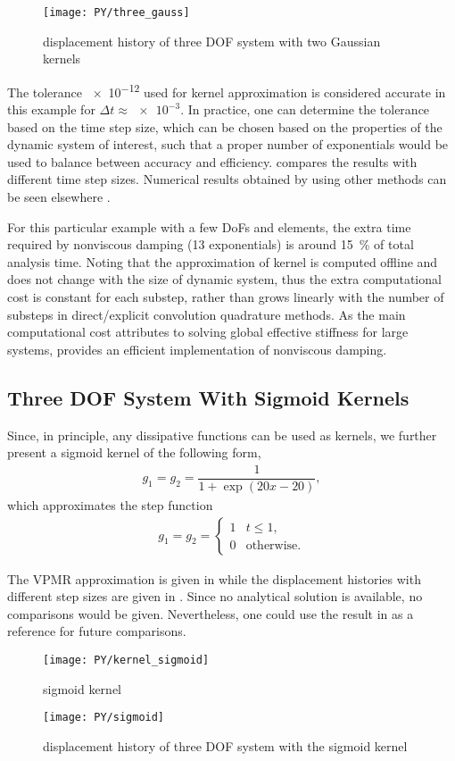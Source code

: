 \begin{figure}[H]
\centering
\texttt{[image: PY/three\_gauss]}
\caption{displacement history of three DOF system with two Gaussian kernels}\label{fig:three_gauss}
\end{figure}
The tolerance \num{e-12} used for kernel approximation is considered accurate in this example for $\Delta{}t\approx\num{e-3}$. In practice, one can determine the tolerance based on the time step size, which can be chosen based on the properties of the dynamic system of interest, such that a proper number of exponentials would be used to balance between accuracy and efficiency.  compares the results with different time step sizes. Numerical results obtained by using other methods can be seen elsewhere \citep{Shen2021}.

For this particular example with a few DoFs and elements, the extra time required by nonviscous damping (\num{13} exponentials) is around \SI{15}{\percent} of total analysis time. Noting that the approximation of kernel is computed offline and does not change with the size of dynamic system, thus the extra computational cost is constant for each substep, rather than grows linearly with the number of substeps in direct/explicit convolution quadrature methods. As the main computational cost attributes to solving global effective stiffness for large systems,  provides an efficient implementation of nonviscous damping.
\subsection{Three DOF System With Sigmoid Kernels}
Since, in principle, any dissipative functions can be used as kernels, we further present a sigmoid kernel of the following form,
\begin{gather}
g_1=g_2=\dfrac{1}{1+\exp\left(20x-20\right)},
\end{gather}
which approximates the step function
\begin{gather}
g_1=g_2=\left\{
\begin{array}{ll}
1&t\leqslant1,\\
0&\text{otherwise.}
\end{array}
\right.
\end{gather}

The VPMR approximation is given in  while the displacement histories with different step sizes are given in . Since no analytical solution is available, no comparisons would be given. Nevertheless, one could use the result in  as a reference for future comparisons.
\begin{figure}[H]
\centering
\texttt{[image: PY/kernel\_sigmoid]}
\caption{sigmoid kernel}\label{fig:sigmoid_kernel}
\end{figure}
\begin{figure}[H]
\centering
\texttt{[image: PY/sigmoid]}
\caption{displacement history of three DOF system with the sigmoid kernel}\label{fig:three_sigmoid}
\end{figure}